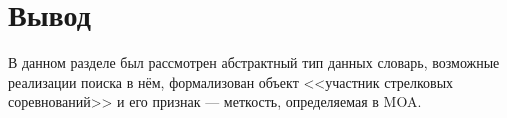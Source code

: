 \section*{Вывод}
В данном разделе был рассмотрен абстрактный тип данных словарь, возможные реализации поиска в нём, формализован объект <<участник стрелковых соревнований>> и его признак --- меткость, определяемая в MOA.

